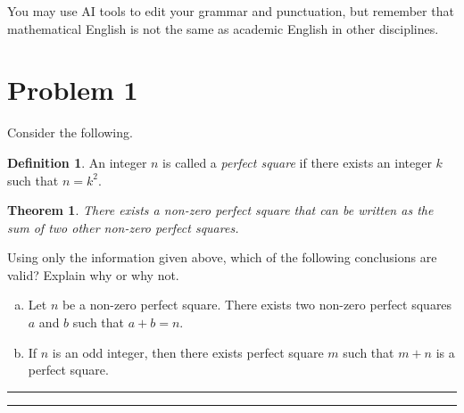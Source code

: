 \documentclass{article}
\newtheorem*{theorem}{Theorem} %
\theoremstyle{definition}
\newtheorem*{definition}{Definition} %
\newenvironment{solution}{\bigskip\hrule{\hfill}}{\bigskip\hrule{\hfill}} %
\begin{document}
You may use AI tools to edit your grammar and punctuation, but remember that mathematical English is not the same as academic English in other disciplines. 

\vfill

\newpage


\section*{Problem 1}

Consider the following.

\begin{definition}
    An integer $n$ is called a \emph{perfect square} if there exists an integer $k$ such that $n=k^2$.
\end{definition}
\begin{theorem}
    There exists a non-zero perfect square that can be written as the sum of two other non-zero perfect squares.
\end{theorem}

Using only the information given above, which of the following conclusions are valid? Explain why or why not.

\begin{enumerate}[a)] %
    \item Let $n$ be a non-zero perfect square. There exists two non-zero perfect squares $a$ and $b$ such that $a+b=n$.

    \item If $n$ is an odd integer, then there exists perfect square $m$ such that $m+n$ is a perfect square.
\end{enumerate}

\begin{solution}


\end{solution}


\newpage

\end{document}
